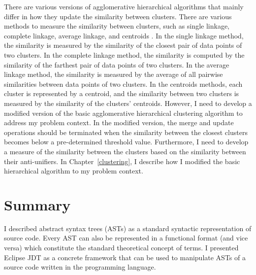 There are various versions of agglomerative hierarchical algorithms that mainly differ in how they update the similarity between clusters. There are various methods to measure the similarity between clusters, such as single linkage, complete linkage, average linkage, and centroids \cite{}. In the single linkage method, the similarity is measured by the similarity of the closest pair of data points of two clusters. In the complete linkage method, the similarity is computed by the similarity of the farthest pair of data points of two clusters. In the average linkage method, the similarity is measured by the average of all pairwise similarities between data points of two clusters. In the centroids methods, each cluster is represented by a centroid, and the similarity between two clusters is measured by the similarity of the clusters' centroids. However, I need to develop a modified version of the basic agglomerative hierarchical clustering algorithm to address my problem context. In the modified version, the merge and update operations should be terminated when the similarity between the closest clusters becomes below a pre-determined threshold value. Furthermore, I need to develop a measure of the similarity between the clusters based on the similarity between their anti-unifiers. In Chapter~\ref{clustering}, I describe how I modified the basic hierarchical algorithm to my problem context.




\section{Summary}  \label{summary}
I described abstract syntax trees (ASTs) as a standard syntactic representation of source code. Every AST can also be represented in a functional format (and vice versa) which constitute the standard theoretical concept of terms. I presented Eclipse JDT as a concrete framework that can be used to manipulate ASTs of a source code written in the  programming language.

